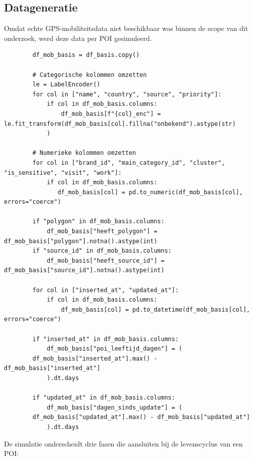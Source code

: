 \subsection{Datageneratie}
Omdat echte GPS-mobiliteitsdata niet beschikbaar was binnen de scope van dit onderzoek, werd deze data per POI gesimuleerd. 

\begin{listing}[H]
    \begin{verbatim}
        df_mob_basis = df_basis.copy()
        
        # Categorische kolommen omzetten
        le = LabelEncoder()
        for col in ["name", "country", "source", "priority"]:
            if col in df_mob_basis.columns:
                df_mob_basis[f"{col}_enc"] = le.fit_transform(df_mob_basis[col].fillna("onbekend").astype(str)
            )
        
        # Numerieke kolommen omzetten
        for col in ["brand_id", "main_category_id", "cluster", "is_sensitive", "visit", "work"]:
            if col in df_mob_basis.columns:
               df_mob_basis[col] = pd.to_numeric(df_mob_basis[col], errors="coerce")
        
        if "polygon" in df_mob_basis.columns:
            df_mob_basis["heeft_polygon"] = df_mob_basis["polygon"].notna().astype(int)
        if "source_id" in df_mob_basis.columns:
            df_mob_basis["heeft_source_id"] = df_mob_basis["source_id"].notna().astype(int)
        
        for col in ["inserted_at", "updated_at"]:
            if col in df_mob_basis.columns:
                df_mob_basis[col] = pd.to_datetime(df_mob_basis[col], errors="coerce")
        
        if "inserted_at" in df_mob_basis.columns:
            df_mob_basis["poi_leeftijd_dagen"] = (
        df_mob_basis["inserted_at"].max() - df_mob_basis["inserted_at"]
            ).dt.days
        
        if "updated_at" in df_mob_basis.columns:
            df_mob_basis["dagen_sinds_update"] = (
        df_mob_basis["updated_at"].max() - df_mob_basis["updated_at"]
            ).dt.days
    \end{verbatim}
    \caption[Voorbereiding Basisinfo-dataset]{Encoding en feature engineering op de dataset als voorbereiding op het mobiliteitsexperiment.}
\end{listing}

De simulatie onderscheidt drie fasen die aansluiten bij de levenscyclus van een POI:

